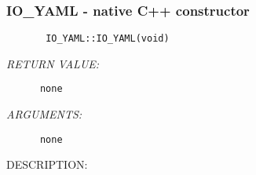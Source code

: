  
\setlength{\oldparskip}{\parskip}
\setlength{\parskip}{1.5ex}
\setlength{\oldparindent}{\parindent}
\setlength{\parindent}{0pt}
\setlength{\oldbaselineskip}{\baselineskip}
\setlength{\baselineskip}{11pt}
 
\def\bv{\begin{verbatim}}
\def\ev{\end{verbatim}}
\def\be{\begin{equation}}
\def\ee{\end{equation}}
\def\bea{\begin{eqnarray}}
\def\eea{\end{eqnarray}}
\def\bi{\begin{itemize}}
\def\ei{\end{itemize}}
\def\bn{\begin{enumerate}}
\def\en{\end{enumerate}}
\def\bd{\begin{description}}
\def\ed{\end{description}}
\def\({\left (}
\def\){\right )}
\def\[{\left [}
\def\]{\right ]}
\def\<{\left  \langle}
\def\>{\right \rangle}
\def\cI{{\cal I}}
\def\diag{\mathop{\rm diag}}
\def\tr{\mathop{\rm tr}}


 
\subsubsection [IO\_YAML] {IO\_YAML - native C++ constructor}


  
\begin{verbatim}       IO_YAML::IO_YAML(void)\end{verbatim}{\em RETURN VALUE:}
\begin{verbatim}      none\end{verbatim}{\em ARGUMENTS:}
\begin{verbatim}      none\end{verbatim}
{\sf DESCRIPTION:\\ }


